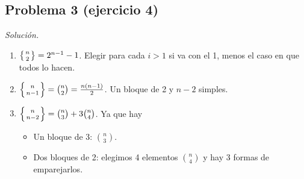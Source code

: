 \subsection*{Problema 3 (ejercicio 4)}
\emph{Solución.}
\begin{enumerate}
\item \(\left\{n\atop2\right\}=2^{n-1}-1\). Elegir para cada \(i>1\) si va con el 1, menos el caso en que todos lo hacen.
\item \(\left\{n\atop n-1\right\}=\binom n2=\frac{n(n-1)}2\). Un bloque de 2 y \(n-2\) simples.
\item \(\left\{n\atop n-2\right\}=\binom n3 + 3\binom n4\). Ya que hay
  \begin{itemize}
  \item Un bloque de 3: \(\binom n3\).
  \item Dos bloques de 2: elegimos 4 elementos \(\binom n4\) y hay 3 formas de emparejarlos.
  \end{itemize}
\end{enumerate}

